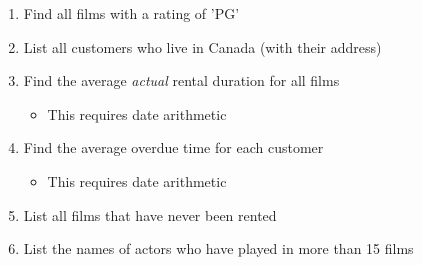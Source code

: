 \begin{exercisebox}
\begin{enumerate}
  \item Find all films with a rating of 'PG'
  \item List all customers who live in Canada (with their address)
  \item Find the average \emph{actual} rental duration for all films
  \begin{itemize}
     \item This requires date arithmetic
  \end{itemize}
  \item Find the average overdue time for each customer
  \begin{itemize}
     \item This requires date arithmetic
  \end{itemize}
  \item List all films that have never been rented
  \item List the names of actors who have played in more than 15 films
\end{enumerate}
\end{exercisebox}
